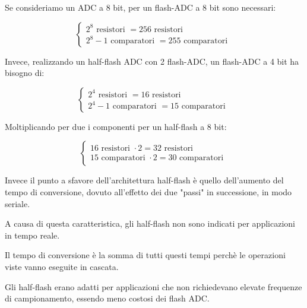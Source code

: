 Se consideriamo un ADC a 8 bit, per un flash-ADC a 8 bit sono necessari:

{
    \Large 
    \begin{equation}
        \begin{cases}
            2^{8} \text{ resistori } = 256 \text{ resistori }
            \\ 
            2^{8} - 1 \text{ comparatori } = 255 \text{ comparatori }
        \end{cases}
    \end{equation}
}

Invece, realizzando un half-flash ADC con 2 flash-ADC, un flash-ADC a 4 bit ha bisogno di: 

{
    \Large 
    \begin{equation}
        \begin{cases}
            2^{4} \text{ resistori } = 16 \text{ resistori }
            \\ 
            2^{4} - 1 \text{ comparatori } = 15 \text{ comparatori }
        \end{cases}
    \end{equation}
}

Moltiplicando per due i componenti per un half-flash a 8 bit: 

{
    \Large 
    \begin{equation}
        \begin{cases}
            16 \text{ resistori } \cdot 2 = 32 \text{ resistori }
            \\ 
            15 \text{ comparatori } \cdot 2 = 30 \text{ comparatori }
        \end{cases}
    \end{equation}
}

Invece il punto a sfavore dell'architettura half-flash è quello dell'aumento del tempo di conversione, dovuto all'effetto dei due "passi" in successione, in modo seriale. \newline 

A causa di questa caratteristica, gli half-flash non sono indicati per applicazioni in tempo reale. \newline 

Il tempo di conversione è la somma di tutti questi tempi perchè le operazioni viste vanno eseguite in cascata. \newline 

Gli half-flash erano adatti per applicazioni che non richiedevano elevate frequenze di campionamento, essendo meno costosi dei flash ADC. \newline 

